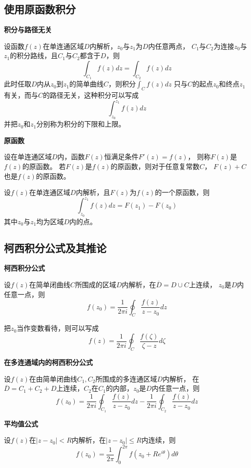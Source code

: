 \documentclass[a4paper,12pt]{article}
\begin{document}
\subsection{使用原函数积分}

\noindent
\textbf{积分与路径无关}

设函数$f\left(z\right)$在单连通区域$D$内解析，$z_0$与$z_1$为$D$内任意两点，
$C_1$与$C_2$为连接$z_0$与$z_1$的积分路线，且$C_1$与$C_2$都含于$D$，则
$$
\int_{C_1}f\left(z\right)dz=\int_{C_2}f\left(z\right)dz
$$
此时任取$D$内从$z_0$到$z_1$的简单曲线$C$，则积分$\int_Cf\left(z\right)dz$
只与$C$的起点$z_0$和终点$z_1$有关，而与$C$的路径无关，这种积分可以写成
$$
\int_{z_0}^{z_1}f\left(z\right)dz
$$
并把$z_0$和$z_1$分别称为积分的下限和上限。

\noindent
\textbf{原函数}

设在单连通区域$D$内，函数$F\left(z\right)$恒满足条件$F'\left(z\right)=f\left(z\right)$，
则称$F\left(z\right)$是$f\left(z\right)$的原函数。
若$F\left(z\right)$是$f\left(z\right)$的原函数，则对于任意复常数$C$，
$F\left(z\right)+C$也是$f\left(z\right)$的原函数。

设$f\left(z\right)$在单连通区域$D$内解析，且$F\left(z\right)$为$f\left(z\right)$的一个原函数，则
$$
\int_{z_0}^{z_1}f\left(z\right)dz=F\left(z_1\right)-F\left(z_0\right)
$$
其中$z_0$与$z_1$均为区域$D$内的点。

\subsection{柯西积分公式及其推论}

\noindent
\textbf{柯西积分公式}

设$f\left(z\right)$在简单闭曲线$C$所围成的区域$D$内解析，在$\overline{D}=D\cup C$上连续，
$z_0$是$D$内任意一点，则
$$
f\left(z_0\right)=\frac1{2\pi i}\oint_C\frac{f\left(z\right)}{z-z_0}dz
$$

把$z_0$当作变数看待，则可以写成
$$
f\left(z\right)=\frac1{2\pi i}\oint_C\frac{f\left(\zeta\right)}{\zeta-z}d\zeta
$$

\noindent
\textbf{在多连通域内的柯西积分公式}

设$f\left(z\right)$在由简单闭曲线$C_1,C_2$所围成的多连通区域$D$内解析，
在$\overline{D}=C_1+C_2+D$上连续，$C_2$在$C_1$的内部，$z_0$是$D$内任意一点，则
$$
f\left(z_0\right)=\frac1{2\pi i}\oint_{C_1}\frac{f\left(z\right)}{z-z_0}dz
-\frac1{2\pi i}\oint_{C_2}\frac{f\left(z\right)}{z-z_0}dz
$$

\noindent
\textbf{平均值公式}

设$f\left(z\right)$在$\left|z-z_0\right|<R$内解析，在$\left|z-z_0\right|\le R$内连续，则
$$
f\left(z_0\right)=\frac1{2\pi}\int_0^{2\pi}f\left(z_0+Re^{i\theta}\right)d\theta
$$
\end{document}
